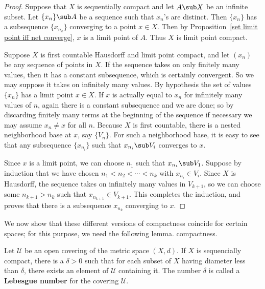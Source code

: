 \begin{proof}
Suppose that $X$ is sequentially compact and let $A\sub X$ be an infinite subset. Let $\{x_n\}\sub A$ be a sequence such that $x_n$'s are distinct. Then $\{x_n\}$ has a subsequence $\{x_{n_k}\}$ converging to a point $x\in X$. Then by Proposition~\ref{set limit point iff net converge}, $x$ is a limit point of $A$. Thus $X$ is limit point compact.\par
Suppose $X$ is first countable Hausdorff and limit point compact, and let $(x_n)$ be any sequence of points in $X$. If the sequence takes on only finitely many values, then it has a constant subsequence, which is certainly convergent. So we may suppose it takes on infinitely many values. By hypothesis the set of values $\{x_n\}$ has a limit point $x\in X$. If $x$ is actually equal to $x_n$ for infinitely many values of $n$, again there is a constant subsequence and we are done; so by discarding finitely many terms at the beginning of the sequence if necessary we may assume $x_n\neq x$ for all $n$. Because $X$ is first countable, there is a nested neighborhood base at $x$, say $\{V_n\}$. For such a neighborhood base, it is easy to see that any subsequence $\{x_{n_i}\}$ such that $x_{n_i}\sub V_i$ converges to $x$.\par
Since $x$ is a limit point, we can choose $n_1$ such that $x_{n_1}\sub V_1$. Suppose by induction that we have chosen $n_1<n_2<\cdots<n_k$ with $x_{n_i}\in V_i$. Since $X$ is Hausdorff, the sequence takes on infinitely many values in $V_{k+1}$, so we can choose some $n_{k+1}>n_k$ such that $x_{n_{k+1}}\in V_{k+1}$. This completes the induction, and proves that there is a subsequence $x_{n_k}$ converging to $x$.
\end{proof}
We now show that these different versions of compactness coincide for certain spaces; for this purpose, we need the following lemma.
compactness.
\begin{lemma}
Let $\mathcal{U}$ be an open covering of the metric space $(X,d)$. If $X$ is sequencially compact, there is a $\delta>0$ such that for each subset of $X$ having diameter less than $\delta$, there exists an element of $\mathcal{U}$ containing it. The number $\delta$ is called a \textbf{Lebesgue number} for the covering $\mathcal{U}$.
\end{lemma}
